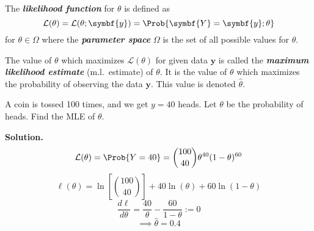 \begin{Definition}{}{}
    The \textbf{\emph{likelihood function}} for $ \theta $ is defined as
    \[ \mathcal{L}(\theta)= \mathcal{L}(\theta;\symbf{y})=\Prob{\symbf{Y}=\symbf{y}; \theta} \]
    for $ \theta\in\Omega $ where the \textbf{\emph{parameter space}} $ \Omega $
    is the set of all possible values for $ \theta $.
\end{Definition}



\begin{Definition}{}{}
    The value of $ \theta $ which maximizes $ \mathcal{L}(\theta) $ for given data $ \symbf{y} $
    is called the \textbf{\emph{maximum likelihood estimate}} (m.l.\ estimate) of $ \theta $.
    It is the value of $ \theta $ which maximizes the probability of observing the data
    $ \symbf{y} $. This value is denoted $ \hat{\theta} $.
\end{Definition}



\begin{Example}{}{}
    A coin is tossed 100 times, and we get $ y=40 $ heads. Let $ \theta $
    be the probability of heads. Find the MLE of $ \theta $.

    \textbf{Solution.}
    \[ \mathcal{L}(\theta)=\Prob{Y=40}=\binom{100}{40}\theta^{40}(1-\theta)^{60} \]
    \[ \ell(\theta)=\ln\left[ \binom{100}{40} \right]+40\ln(\theta)+60\ln(1-\theta) \]
    \[ \frac{d\ell}{d\theta}=\frac{40}{\theta} -\frac{60}{1-\theta} :=0 \]
    \[ \implies \hat{\theta}=0.4 \]
\end{Example}
